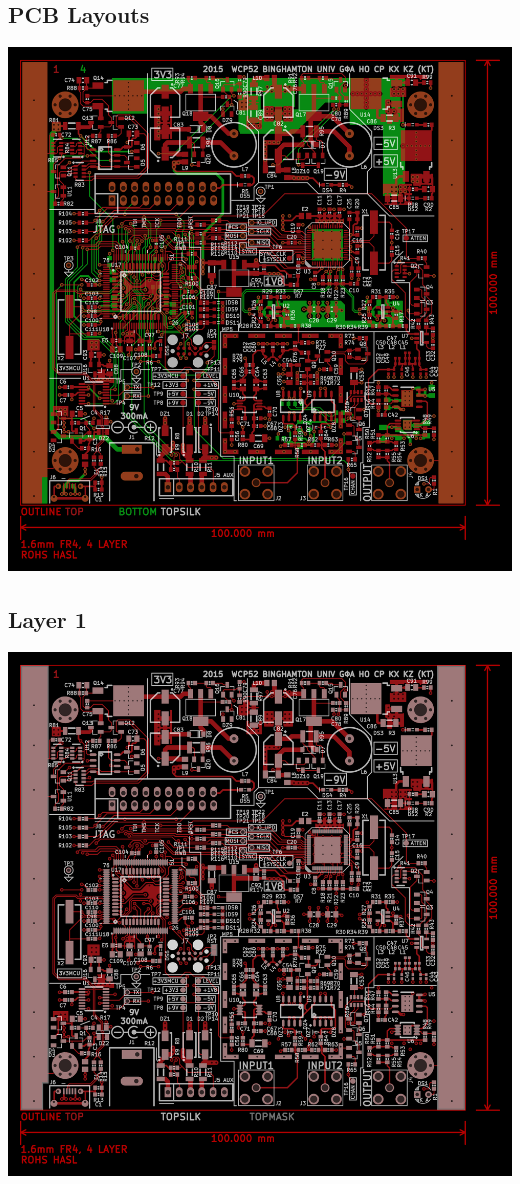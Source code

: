 \documentclass[article,oneside]{memoir}
\begin{document}
\begin{appendices}
    \newpage \chapter{PCB Layouts}
    \begin{vplace}[0.5]\includegraphics[width=6.5in]{render_2l}\end{vplace}
    \newpage \section{Layer 1}
    \begin{vplace}\includegraphics[width=6.5in]{render_lyr1}\end{vplace}

\end{appendices}
\end{document}
